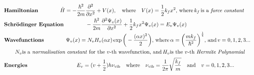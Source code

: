 \documentclass{memoir}[11pt,oneside,a4paper,openany]
\newenvironment{myblock}[1]{%
    \tcolorbox[beamer,%
    noparskip,breakable,
    colback=LightBlue,colframe=DarkBlue,%
    colbacklower=DarkBlue!75!LightBlue,%
    title=#1]}%
    {\endtcolorbox}
\newcommand{\wf}{\ensuremath{\Psi}\xspace}
\newcommand{\nuv}{\ensuremath{\nu_{\text{vib}}}}
\begin{document}
\begin{myblock}{\begin{center}Particle in Harmonic Potential\end{center}}
	\begin{center}
		\begin{align*} & \text{\textbf{Hamiltonian}} \qquad\qquad \hat{H} = -\frac{\hbar^2}{2m}\frac{\partial^2}{\partial x^2} + V(x),\quad  \text{where} \quad V(x) = \frac{1}{2}k_fx^2, \,\text{where}\,k_f\,\text{is a \emph{force constant}} \\
			& \text{\textbf{Schr{\"o}dinger Equation}} \qquad\qquad -\frac{\hbar^2}{2m}\frac{\partial^2\wf_v(x)}{\partial x^2} + \frac{1}{2}k_fx^2\wf_v(x) = E_v \wf_v(x) \\
			& \text{\textbf{Wavefunctions}} \qquad\qquad \wf_v(x) = N_vH_v(\alpha x)\exp{\bigg(-\frac{(\alpha x)^2}{2}\bigg)}, \,\text{where} \,\alpha = \bigg(\frac{mk_f}{\hbar^2}\bigg)^{\frac{1}{4}},\,\text{and}\, v=0,1,2,3...\\
			& \qquad N_v \text{is a \emph{normalisation constant} for the $v$-th wavefunction, and}\, H_v \text{is the $v$-th \emph{Hermite Polynomial}} \\
			& \text{\textbf{Energies}} \qquad\qquad\qquad\qquad\quad E_v = (v+\frac{1}{2})h\nuv \quad \text{where} \quad \nuv = \frac{1}{2\pi}\sqrt{\frac{k_f}{m}} \quad \text{and} \quad v=0,1,2,3...
	\end{align*}
	\end{center}
\end{myblock}
\end{document}
